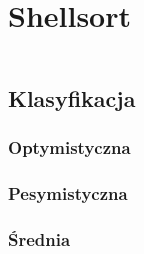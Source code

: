 

\section{Shellsort}
\begin{equation}
\end{equation}
\subsection{Klasyfikacja}
\subsubsection{Optymistyczna}

\subsubsection{Pesymistyczna}

\subsubsection{Średnia}


